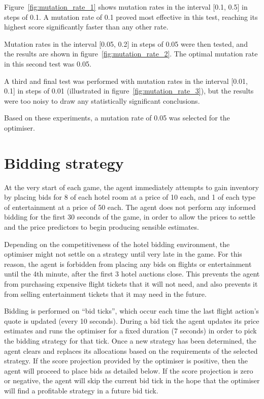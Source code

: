 \documentclass[a4paper]{proc}
\begin{document}
Figure~\ref{fig:mutation_rate_1} shows mutation rates in the interval [0.1, 0.5] in steps of 0.1. A mutation rate of 0.1 proved most effective in this test, reaching its highest score significantly faster than any other rate.

Mutation rates in the interval [0.05, 0.2] in steps of 0.05 were then tested, and the results are shown in figure~\ref{fig:mutation_rate_2}. The optimal mutation rate in this second test was 0.05.

A third and final test was performed with mutation rates in the interval [0.01, 0.1] in steps of 0.01 (illustrated in figure~\ref{fig:mutation_rate_3}), but the results were too noisy to draw any statistically significant conclusions.

Based on these experiments, a mutation rate of 0.05 was selected for the optimiser.

\section{Bidding strategy}

At the very start of each game, the agent immediately attempts to gain inventory by placing bids for 8 of each hotel room at a price of 10 each, and 1 of each type of entertainment at a price of 50 each. The agent does not perform any informed bidding for the first 30 seconds of the game, in order to allow the prices to settle and the price predictors to begin producing sensible estimates.

Depending on the competitiveness of the hotel bidding environment, the optimiser might not settle on a strategy until very late in the game. For this reason, the agent is forbidden from placing any bids on flights or entertainment until the 4th minute, after the first 3 hotel auctions close. This prevents the agent from purchasing expensive flight tickets that it will not need, and also prevents it from selling entertainment tickets that it may need in the future.

Bidding is performed on ``bid ticks'', which occur each time the last flight action's quote is updated (every 10 seconds). During a bid tick the agent updates its price estimates and runs the optimiser for a fixed duration (7 seconds) in order to pick the bidding strategy for that tick. Once a new strategy has been determined, the agent clears and replaces its allocations based on the requirements of the selected strategy. If the score projection provided by the optimiser is positive, then the agent will proceed to place bids as detailed below. If the score projection is zero or negative, the agent will skip the current bid tick in the hope that the optimiser will find a profitable strategy in a future bid tick.
\end{document}
